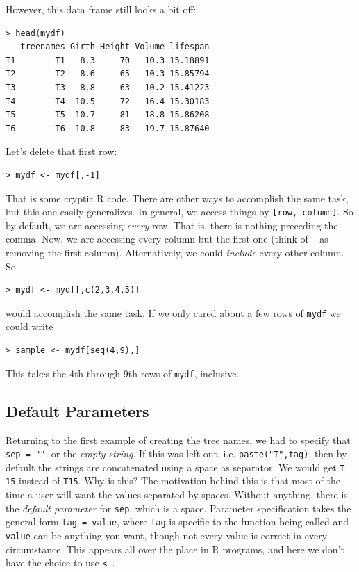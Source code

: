 \documentclass[12pt]{article}
\theoremstyle{remark}
\begin{document}
However, this data frame still looks a bit off:
\begin{Verbatim}[frame=single, fontsize=\small]
> head(mydf)
   treenames Girth Height Volume lifespan
T1        T1   8.3     70   10.3 15.18891
T2        T2   8.6     65   10.3 15.85794
T3        T3   8.8     63   10.2 15.41223
T4        T4  10.5     72   16.4 15.30183
T5        T5  10.7     81   18.8 15.86208
T6        T6  10.8     83   19.7 15.87640
\end{Verbatim}
Let's delete that first row:
\begin{verbatim}
> mydf <- mydf[,-1]
\end{verbatim}

That is some cryptic R code. There are other ways to accomplish the same task, but this one easily generalizes. In general, we access things by \verb|[row, column]|. So by default, we are accessing \emph{every} row. That is, there is nothing preceding the comma. Now, we are accessing every column but the first one (think of \verb|-| as removing the first column). Alternatively, we could \emph{include} every other column. So
\begin{verbatim}
> mydf <- mydf[,c(2,3,4,5)]
\end{verbatim}
would accomplish the same task. If we only cared about a few rows of \verb|mydf| we could write
\begin{verbatim}
> sample <- mydf[seq(4,9),]
\end{verbatim}
This takes the 4th through 9th rows of \verb|mydf|, inclusive.

\subsection{Default Parameters}
Returning to the first example of creating the tree names, we had to specify that \verb|sep = ""|, or the \emph{empty string}. If this was left out, i.e. \verb|paste("T",tag)|, then by default the strings are concatenated using a space as separator. We would get \verb|T 15| instead of \verb|T15|. Why is this? The motivation behind this is that most of the time a user will want the values separated by spaces. Without anything, there is the \emph{default parameter} for \verb|sep|, which is a space. Parameter specification takes the general form \verb|tag = value|, where \verb|tag| is specific to the function being called and \verb|value| can be anything you want, though not every value is correct in every circumstance. This appears all over the place in R programs, and here we don't have the choice to use \verb|<-|.
\end{document}
